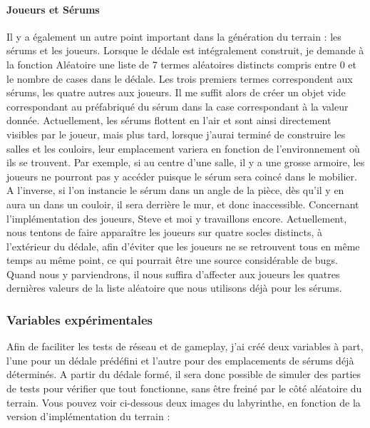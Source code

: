 \documentclass{article}
\begin{document}
\paragraph{Joueurs et Sérums}
Il y a également un autre point important dans la génération du terrain : les sérums et les joueurs.
Lorsque le dédale est intégralement construit, je demande à la fonction Aléatoire une liste de 7 termes aléatoires distincts compris entre 0 et le nombre de cases dans le dédale.
Les trois premiers termes correspondent aux sérums, les quatre autres aux joueurs. Il me suffit alors de créer un objet vide correspondant au préfabriqué du sérum dans la case correspondant à la valeur donnée. Actuellement, les sérums flottent en l'air et sont ainsi directement visibles par le joueur, mais plus tard, lorsque j'aurai terminé de construire les salles et les couloirs, leur emplacement variera en fonction de l'environnement où ils se trouvent. Par exemple, si au centre d'une salle, il y a une grosse armoire, les joueurs ne pourront pas y accéder puisque le sérum sera coincé dans le mobilier. A l'inverse, si l'on instancie le sérum dans un angle de la pièce, dès qu'il y en aura un dans un couloir, il sera derrière le mur, et donc inaccessible.
Concernant l'implémentation des joueurs, Steve et moi y travaillons encore. Actuellement, nous tentons de faire apparaître les joueurs sur quatre socles distincts, à l'extérieur du dédale, afin d'éviter que les joueurs ne se retrouvent tous en même temps au même point, ce qui pourrait être une source considérable de bugs. Quand nous y parviendrons, il nous suffira d'affecter aux joueurs les quatres dernières valeurs de la liste aléatoire que nous utilisons déjà pour les sérums.

\subsubsection{Variables expérimentales}
Afin de faciliter les tests de réseau et de gameplay, j'ai créé deux variables à part, l'une pour un dédale prédéfini et l'autre pour des emplacements de sérums déjà déterminés. A partir du dédale formé, il sera donc possible de simuler des parties de tests pour vérifier que tout fonctionne, sans être freiné par le côté aléatoire du terrain. Vous pouvez voir ci-dessous deux images du labyrinthe, en fonction de la version d'implémentation du terrain :
\end{document}
